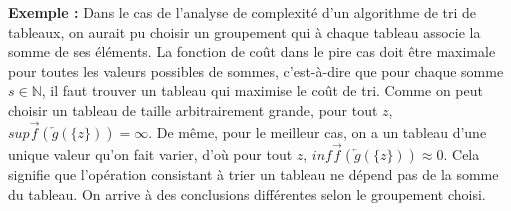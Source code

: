 \documentclass[../../../main.tex]{subfiles}
\begin{document}
\textbf{Exemple :} Dans le cas de l'analyse de complexité d'un algorithme de tri de tableaux, on aurait pu choisir un groupement qui à chaque tableau associe la somme de ses éléments. La fonction de coût dans le pire cas doit être maximale pour toutes les valeurs possibles de sommes, c'est-à-dire que pour chaque somme $s\in\mathbb{N}$, il faut trouver un tableau qui maximise le coût de tri. Comme on peut choisir un tableau de taille arbitrairement grande, pour tout $z$, $sup \overrightarrow{f}\left(\overleftarrow{g}\left(\{z\}\right)\right) = \infty$. De même, pour le meilleur cas, on a un tableau d'une unique valeur qu'on fait varier, d'où pour tout $z$, $inf \overrightarrow{f}\left(\overleftarrow{g}\left(\{z\}\right)\right) \approx 0$. Cela signifie que l'opération consistant à trier un tableau ne dépend pas de la somme du tableau. On arrive à des conclusions différentes selon le groupement choisi.
\end{document}
